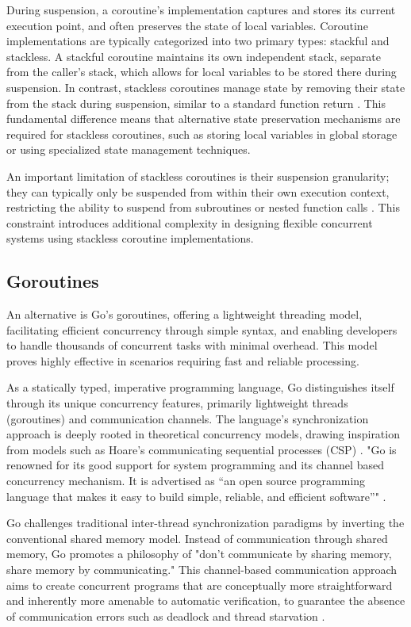 \documentclass[]{final}
\begin{document}
During suspension, a coroutine's implementation captures and stores
its current execution point, and often preserves the state of local variables.
Coroutine implementations are typically categorized into two primary types:
stackful and stackless. A stackful coroutine maintains its own independent
stack, separate from the caller's stack, which allows for local variables
to be stored there during suspension. In contrast, stackless coroutines
manage state by removing their state from the stack
during suspension, similar to a standard function return \cite{belson_survey_2019}.
This fundamental difference means that alternative state preservation
mechanisms are required for stackless coroutines, such as storing
local variables in global storage or using specialized state management techniques.

An important limitation of stackless coroutines is their suspension granularity;
they can typically only be suspended from within their own execution context,
restricting the ability to suspend from subroutines or nested function calls
\cite{belson_survey_2019}. This constraint introduces additional complexity
in designing flexible concurrent systems using stackless coroutine implementations.

\subsection{Goroutines}

An alternative is Go’s goroutines, offering a lightweight threading model,
facilitating efficient concurrency through
simple syntax, and enabling developers to handle thousands of concurrent tasks with
minimal overhead. This model proves highly effective in scenarios requiring fast
and reliable processing.

As a statically typed, imperative programming language, Go distinguishes
itself through its unique concurrency features, primarily lightweight threads
(goroutines) and communication channels.
The language's synchronization approach
is deeply rooted in theoretical concurrency models,
drawing inspiration from models such as Hoare's communicating sequential
processes (CSP) \cite{lange_empirical_2019}.
"Go is renowned for its good support for system programming
and its channel based concurrency mechanism. It is advertised
as “an open source programming
language that makes it easy to build simple, reliable, and
efficient software”" \cite{lange_empirical_2019}.

Go challenges traditional inter-thread synchronization
paradigms by inverting the conventional shared memory model. Instead
of communication through shared memory, Go promotes a philosophy of
"don't communicate by sharing memory, share memory by communicating."
This channel-based communication approach aims to create concurrent programs
that are conceptually more straightforward and inherently more amenable
to automatic verification, to guarantee
the absence of communication errors such as deadlock and
thread starvation \cite{lange_empirical_2019}.
\end{document}
